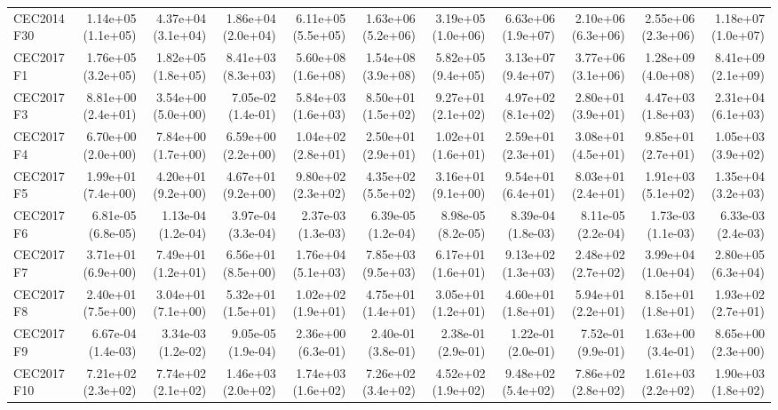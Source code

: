 \begin{longtable}{lrrrrrrrrrr}
CEC2014 F30 & 1.14e+05 (1.1e+05) & 4.37e+04 (3.1e+04) & 1.86e+04 (2.0e+04) & 6.11e+05 (5.5e+05) & 1.63e+06 (5.2e+06) & 3.19e+05 (1.0e+06) & 6.63e+06 (1.9e+07) & 2.10e+06 (6.3e+06) & 2.55e+06 (2.3e+06) & 1.18e+07 (1.0e+07) \\
CEC2017 F1 & 1.76e+05 (3.2e+05) & 1.82e+05 (1.8e+05) & 8.41e+03 (8.3e+03) & 5.60e+08 (1.6e+08) & 1.54e+08 (3.9e+08) & 5.82e+05 (9.4e+05) & 3.13e+07 (9.4e+07) & 3.77e+06 (3.1e+06) & 1.28e+09 (4.0e+08) & 8.41e+09 (2.1e+09) \\
CEC2017 F3 & 8.81e+00 (2.4e+01) & 3.54e+00 (5.0e+00) & 7.05e-02 (1.4e-01) & 5.84e+03 (1.6e+03) & 8.50e+01 (1.5e+02) & 9.27e+01 (2.1e+02) & 4.97e+02 (8.1e+02) & 2.80e+01 (3.9e+01) & 4.47e+03 (1.8e+03) & 2.31e+04 (6.1e+03) \\
CEC2017 F4 & 6.70e+00 (2.0e+00) & 7.84e+00 (1.7e+00) & 6.59e+00 (2.2e+00) & 1.04e+02 (2.8e+01) & 2.50e+01 (2.9e+01) & 1.02e+01 (1.6e+01) & 2.59e+01 (2.3e+01) & 3.08e+01 (4.5e+01) & 9.85e+01 (2.7e+01) & 1.05e+03 (3.9e+02) \\
CEC2017 F5 & 1.99e+01 (7.4e+00) & 4.20e+01 (9.2e+00) & 4.67e+01 (9.2e+00) & 9.80e+02 (2.3e+02) & 4.35e+02 (5.5e+02) & 3.16e+01 (9.1e+00) & 9.54e+01 (6.4e+01) & 8.03e+01 (2.4e+01) & 1.91e+03 (5.1e+02) & 1.35e+04 (3.2e+03) \\
CEC2017 F6 & 6.81e-05 (6.8e-05) & 1.13e-04 (1.2e-04) & 3.97e-04 (3.3e-04) & 2.37e-03 (1.3e-03) & 6.39e-05 (1.2e-04) & 8.98e-05 (8.2e-05) & 8.39e-04 (1.8e-03) & 8.11e-05 (2.2e-04) & 1.73e-03 (1.1e-03) & 6.33e-03 (2.4e-03) \\
CEC2017 F7 & 3.71e+01 (6.9e+00) & 7.49e+01 (1.2e+01) & 6.56e+01 (8.5e+00) & 1.76e+04 (5.1e+03) & 7.85e+03 (9.5e+03) & 6.17e+01 (1.6e+01) & 9.13e+02 (1.3e+03) & 2.48e+02 (2.7e+02) & 3.99e+04 (1.0e+04) & 2.80e+05 (6.3e+04) \\
CEC2017 F8 & 2.40e+01 (7.5e+00) & 3.04e+01 (7.1e+00) & 5.32e+01 (1.5e+01) & 1.02e+02 (1.9e+01) & 4.75e+01 (1.4e+01) & 3.05e+01 (1.2e+01) & 4.60e+01 (1.8e+01) & 5.94e+01 (2.2e+01) & 8.15e+01 (1.8e+01) & 1.93e+02 (2.7e+01) \\
CEC2017 F9 & 6.67e-04 (1.4e-03) & 3.34e-03 (1.2e-02) & 9.05e-05 (1.9e-04) & 2.36e+00 (6.3e-01) & 2.40e-01 (3.8e-01) & 2.38e-01 (2.9e-01) & 1.22e-01 (2.0e-01) & 7.52e-01 (9.9e-01) & 1.63e+00 (3.4e-01) & 8.65e+00 (2.3e+00) \\
CEC2017 F10 & 7.21e+02 (2.3e+02) & 7.74e+02 (2.1e+02) & 1.46e+03 (2.0e+02) & 1.74e+03 (1.6e+02) & 7.26e+02 (3.4e+02) & 4.52e+02 (1.9e+02) & 9.48e+02 (5.4e+02) & 7.86e+02 (2.8e+02) & 1.61e+03 (2.2e+02) & 1.90e+03 (1.8e+02) \\

\end{longtable}
